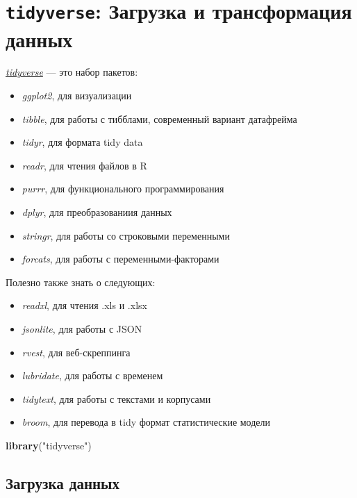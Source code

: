 \documentclass[]{book}
\newenvironment{Shaded}{\begin{snugshade}}{\end{snugshade}}
\newcommand{\KeywordTok}[1]{\textcolor[rgb]{0.13,0.29,0.53}{\textbf{#1}}}
\newcommand{\NormalTok}[1]{#1}
\newcommand{\StringTok}[1]{\textcolor[rgb]{0.31,0.60,0.02}{#1}}
\providecommand{\tightlist}{%
  \setlength{\itemsep}{0pt}\setlength{\parskip}{0pt}}
\begin{document}
\hypertarget{tidy_dplyr}{%
\chapter{\texorpdfstring{\texttt{tidyverse}: Загрузка и трансформация данных}{tidyverse: Загрузка и трансформация данных}}\label{tidy_dplyr}}

\href{https://www.tidyverse.org}{\emph{tidyverse}} --- это набор пакетов:

\begin{itemize}
\tightlist
\item
  \emph{ggplot2}, для визуализации
\item
  \emph{tibble}, для работы с тибблами, современный вариант датафрейма
\item
  \emph{tidyr}, для формата tidy data
\item
  \emph{readr}, для чтения файлов в R
\item
  \emph{purrr}, для функционального программирования
\item
  \emph{dplyr}, для преобразованиия данных
\item
  \emph{stringr}, для работы со строковыми переменными
\item
  \emph{forcats}, для работы с переменными-факторами
\end{itemize}

Полезно также знать о следующих:

\begin{itemize}
\tightlist
\item
  \emph{readxl}, для чтения .xls и .xlsx
\item
  \emph{jsonlite}, для работы с JSON
\item
  \emph{rvest}, для веб-скреппинга
\item
  \emph{lubridate}, для работы с временем
\item
  \emph{tidytext}, для работы с текстами и корпусами
\item
  \emph{broom}, для перевода в tidy формат статистические модели
\end{itemize}

\begin{Shaded}
\begin{Highlighting}[]
\KeywordTok{library}\NormalTok{(}\StringTok{"tidyverse"}\NormalTok{)}
\end{Highlighting}
\end{Shaded}

\hypertarget{section-3}{%
\section{Загрузка данных}\label{section-3}}
\end{document}
